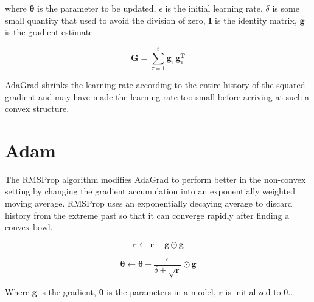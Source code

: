 where $\boldsymbol{\theta}$ is the parameter to be updated, $\epsilon$ is the initial learning rate, $\delta$ is some small quantity that used to avoid the division of zero, $\boldsymbol{I}$ is the identity matrix, $\boldsymbol{g}$ is the gradient estimate.

\begin{equation}
\boldsymbol{G} = \sum_{\tau = 1}^{t} \boldsymbol{g_{\tau} g_{\tau}^{T}}
\end{equation}


AdaGrad shrinks the learning rate according to the entire history of the squared gradient and may have made the learning rate too small before arriving at such a convex structure.

\section{Adam}
\label{sec:adam}

The RMSProp algorithm modifies AdaGrad to perform better in the non-convex setting by changing the gradient accumulation into an exponentially weighted moving average. 
RMSProp uses an exponentially decaying average to discard history from the extreme past so that it can converge rapidly after finding a convex bowl.

\begin{equation}
\boldsymbol{r} \leftarrow \boldsymbol{r} + \boldsymbol{g} \odot \boldsymbol{g}
\end{equation}

\begin{equation}
\boldsymbol{\theta} \leftarrow \boldsymbol{\theta} - \frac{\epsilon}{\delta + \sqrt{\boldsymbol{r}}} \odot \boldsymbol{g}
\end{equation}

Where $\boldsymbol{g}$ is the gradient, $\boldsymbol{\theta}$ is the parameters in a model, $\boldsymbol{r}$ is initialized to $0$..






